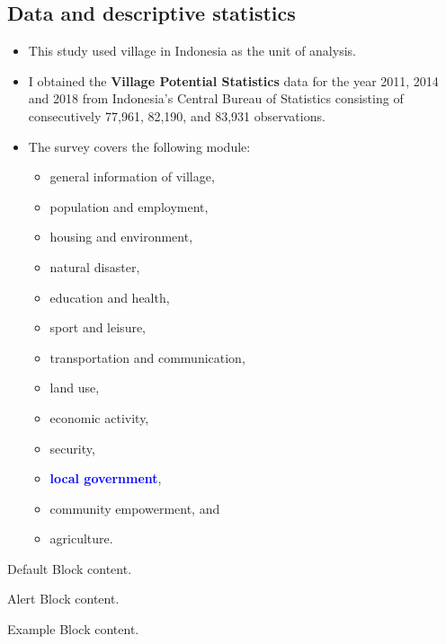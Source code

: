 \documentclass[
11pt,notheorems,hyperref={pdfauthor=Maghfira Ramadhani}
]{beamer}
\newcommand{\al}[1]{\textbf{\alert{#1}}}
\newcommand{\alb}[1]{\textbf{\textcolor{blue}{#1}}}
\begin{document}
\subsection{Data and descriptive statistics}
\begin{frame}
    \begin{itemize}
        \item This study used village in Indonesia as the unit of analysis. 
        \item I obtained the \al{Village Potential Statistics} data for the year 2011, 2014 and 2018 from Indonesia's Central Bureau of Statistics consisting of consecutively 77,961, 82,190, and 83,931 observations.
        \item The survey covers the following module:
        \begin{multicols}{2}
        \begin{itemize}
            \item general information of village,
            \item population and employment, 
            \item housing and environment, 
            \item natural disaster, 
            \item education and health, 
            \item sport and leisure, 
            \item transportation and communication,
            \item land use,
            \item economic activity, 
            \item security, 
            \item \alb{local government}, 
            \item community empowerment, and \item agriculture.
        \end{itemize}
        \end{multicols}
\end{itemize}
\end{frame}
\begin{frame}

   \centering
	\begin{minipage}[b]{0.5\textwidth}

	  \begin{block}{Default}
        Block content.
      \end{block}

      \begin{alertblock}{Alert}
        Block content.
      \end{alertblock}

      \begin{exampleblock}{Example}
        Block content.
      \end{exampleblock}      
      
	\end{minipage}	
\end{frame}
\end{document}
